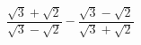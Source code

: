 \begin{ex}[type=expression]
	\begin{condition}
		\( \dfrac{\sqrt{3}+\sqrt{2}}{\sqrt{3}-\sqrt{2}}-\dfrac{\sqrt{3}-\sqrt{2}}{\sqrt{3}+\sqrt{2}} \)
	\end{condition}
\end{ex}